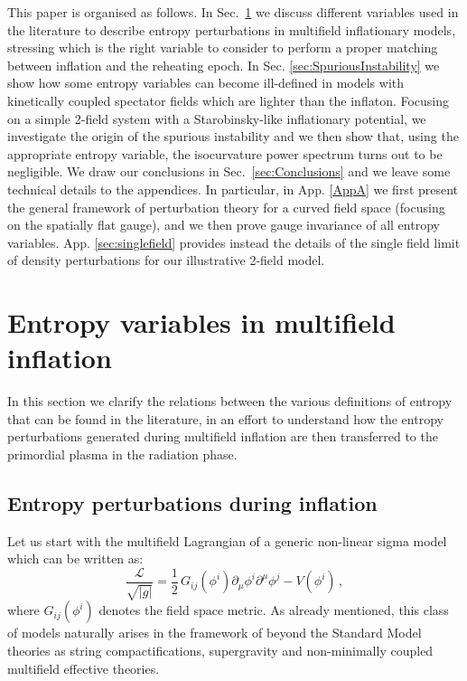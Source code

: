\documentclass[a4paper,11pt]{article}
\def\be{\begin{equation}}
\def\ee{\end{equation}}
\newcommand{\mc}{\mathcal}
\begin{document}
This paper is organised as follows. In Sec.~\ref{sec:EntropyPerturbations} we discuss different variables used in the literature to describe entropy perturbations in multifield inflationary models, stressing which is the right variable to consider to perform a proper matching between inflation and the reheating epoch. In Sec. \ref{sec:SpuriousInstability} we show how some entropy variables can become ill-defined in models with kinetically coupled spectator fields which are lighter than the inflaton. Focusing on a simple 2-field system with a Starobinsky-like inflationary potential, we investigate the origin of the spurious instability and we then show that, using the appropriate entropy variable, the isocurvature power spectrum turns out to be negligible. We draw our conclusions in Sec.~\ref{sec:Conclusions} and we leave some technical details to the appendices. In particular, in App. \ref{AppA} we first present the general framework of perturbation theory for a curved field space (focusing on the spatially flat gauge), and we then prove gauge invariance of all entropy variables. App. \ref{sec:singlefield} provides instead the details of the single field limit of density perturbations for our illustrative 2-field model.


\section{Entropy variables in multifield inflation}
\label{sec:EntropyPerturbations}

In this section we clarify the relations between the various definitions of entropy that can be found in the literature, in an effort to understand how the entropy perturbations generated during multifield inflation are then transferred to the primordial plasma in the radiation phase.

\subsection{Entropy perturbations during inflation}
\label{sec:PerturbationsDuringInflation}

Let us start with the multifield Lagrangian of a generic non-linear sigma model which can be written as:
\be
\frac{\mc{L}}{\sqrt{|g|}}=\frac12\, G_{ij}(\phi^i)\partial_\mu \phi^i \partial^\mu \phi^j-V(\phi^i)\,,
\label{eq:L}
\ee
where $G_{ij}(\phi^i)$ denotes the field space metric. As already mentioned, this class of models naturally arises in the framework of beyond the Standard Model theories as string compactifications, supergravity and non-minimally coupled multifield effective theories. 
\end{document}
